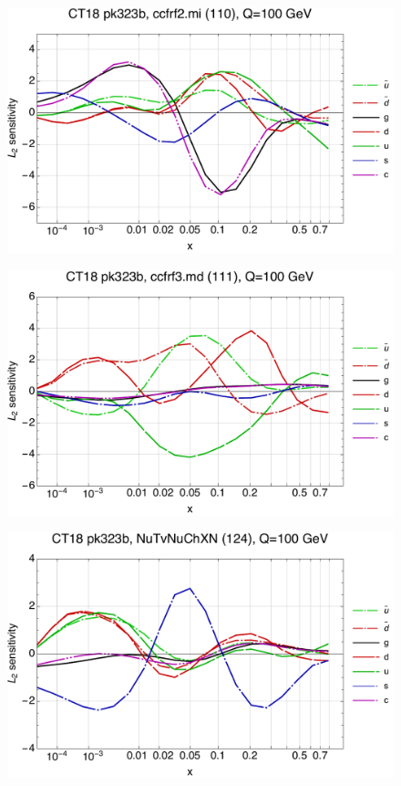 \documentclass[10pt,aps,prd,floatfix,titlepage]{revtex4}
\begin{document}
\begin{figure}
\includegraphics[width=\textwidth,height=0.44\textheight,keepaspectratio]{1/110_ct18nn_L2_q100_Sf_1.pdf}
\caption{}
\end{figure}
\clearpage
\begin{figure}
\includegraphics[width=\textwidth,height=0.44\textheight,keepaspectratio]{1/111_ct18nn_L2_q100_Sf_1.pdf}
\caption{}
\end{figure}
\begin{figure}
\includegraphics[width=\textwidth,height=0.44\textheight,keepaspectratio]{1/124_ct18nn_L2_q100_Sf_1.pdf}
\caption{}
\end{figure}
\end{document}
